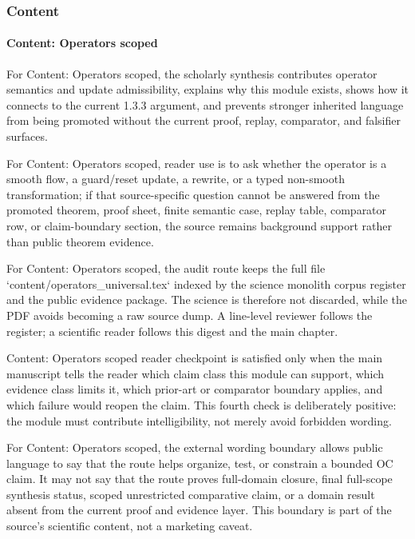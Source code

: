 \subsubsection{Content}

\paragraph{Content: Operators scoped}

For Content: Operators scoped, the scholarly synthesis contributes operator semantics and update admissibility, explains why this module exists, shows how it connects to the current 1.3.3 argument, and prevents stronger inherited language from being promoted without the current proof, replay, comparator, and falsifier surfaces.


For Content: Operators scoped, reader use is to ask whether the operator is a smooth flow, a guard/reset update, a rewrite, or a typed non-smooth transformation; if that source-specific question cannot be answered from the promoted theorem, proof sheet, finite semantic case, replay table, comparator row, or claim-boundary section, the source remains background support rather than public theorem evidence.


For Content: Operators scoped, the audit route keeps the full file `content/operators\_universal.tex` indexed by the science monolith corpus register and the public evidence package. The science is therefore not discarded, while the PDF avoids becoming a raw source dump. A line-level reviewer follows the register; a scientific reader follows this digest and the main chapter.


Content: Operators scoped reader checkpoint is satisfied only when the main manuscript tells the reader which claim class this module can support, which evidence class limits it, which prior-art or comparator boundary applies, and which failure would reopen the claim. This fourth check is deliberately positive: the module must contribute intelligibility, not merely avoid forbidden wording.


For Content: Operators scoped, the external wording boundary allows public language to say that the route helps organize, test, or constrain a bounded OC claim. It may not say that the route proves full-domain closure, final full-scope synthesis status, scoped unrestricted comparative claim, or a domain result absent from the current proof and evidence layer. This boundary is part of the source's scientific content, not a marketing caveat.


